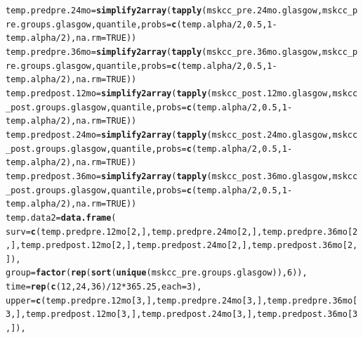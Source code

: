 \documentclass{article}\usepackage[]{graphicx}\usepackage[]{color}
\makeatletter
\newcommand{\hlnum}[1]{\textcolor[rgb]{0.686,0.059,0.569}{#1}}%
\newcommand{\hlopt}[1]{\textcolor[rgb]{0,0,0}{#1}}%
\newcommand{\hlstd}[1]{\textcolor[rgb]{0.345,0.345,0.345}{#1}}%
\newcommand{\hlkwb}[1]{\textcolor[rgb]{0.69,0.353,0.396}{#1}}%
\newcommand{\hlkwc}[1]{\textcolor[rgb]{0.333,0.667,0.333}{#1}}%
\newcommand{\hlkwd}[1]{\textcolor[rgb]{0.737,0.353,0.396}{\textbf{#1}}}%
\newenvironment{kframe}{%
 \def\at@end@of@kframe{}%
 \ifinner\ifhmode%
  \def\at@end@of@kframe{\end{minipage}}%
  \begin{minipage}{\columnwidth}%
 \fi\fi%
 \def\FrameCommand##1{\hskip\@totalleftmargin \hskip-\fboxsep
 \colorbox{shadecolor}{##1}\hskip-\fboxsep
     \hskip-\linewidth \hskip-\@totalleftmargin \hskip\columnwidth}%
 \MakeFramed {\advance\hsize-\width
   \@totalleftmargin\z@ \linewidth\hsize
   \@setminipage}}%
 {\par\unskip\endMakeFramed%
 \at@end@of@kframe}
\newenvironment{knitrout}{}{} %
\makeatother
\begin{document}
\begin{knitrout}
\begin{kframe}
\begin{alltt}
\hlstd{temp.predpre.24mo} \hlkwb{=} \hlkwd{simplify2array}\hlstd{(}\hlkwd{tapply}\hlstd{(mskcc_pre.24mo.glasgow, mskcc_pre.groups.glasgow, quantile,} \hlkwc{probs} \hlstd{=} \hlkwd{c}\hlstd{(temp.alpha}\hlopt{/}\hlnum{2}\hlstd{,} \hlnum{0.5}\hlstd{,} \hlnum{1}\hlopt{-}\hlstd{temp.alpha}\hlopt{/}\hlnum{2}\hlstd{),} \hlkwc{na.rm} \hlstd{=} \hlnum{TRUE}\hlstd{))}
\hlstd{temp.predpre.36mo} \hlkwb{=} \hlkwd{simplify2array}\hlstd{(}\hlkwd{tapply}\hlstd{(mskcc_pre.36mo.glasgow, mskcc_pre.groups.glasgow, quantile,} \hlkwc{probs} \hlstd{=} \hlkwd{c}\hlstd{(temp.alpha}\hlopt{/}\hlnum{2}\hlstd{,} \hlnum{0.5}\hlstd{,} \hlnum{1}\hlopt{-}\hlstd{temp.alpha}\hlopt{/}\hlnum{2}\hlstd{),} \hlkwc{na.rm} \hlstd{=} \hlnum{TRUE}\hlstd{))}
\hlstd{temp.predpost.12mo} \hlkwb{=} \hlkwd{simplify2array}\hlstd{(}\hlkwd{tapply}\hlstd{(mskcc_post.12mo.glasgow, mskcc_post.groups.glasgow, quantile,} \hlkwc{probs} \hlstd{=} \hlkwd{c}\hlstd{(temp.alpha}\hlopt{/}\hlnum{2}\hlstd{,} \hlnum{0.5}\hlstd{,} \hlnum{1}\hlopt{-}\hlstd{temp.alpha}\hlopt{/}\hlnum{2}\hlstd{),} \hlkwc{na.rm} \hlstd{=} \hlnum{TRUE}\hlstd{))}
\hlstd{temp.predpost.24mo} \hlkwb{=} \hlkwd{simplify2array}\hlstd{(}\hlkwd{tapply}\hlstd{(mskcc_post.24mo.glasgow, mskcc_post.groups.glasgow, quantile,} \hlkwc{probs} \hlstd{=} \hlkwd{c}\hlstd{(temp.alpha}\hlopt{/}\hlnum{2}\hlstd{,} \hlnum{0.5}\hlstd{,} \hlnum{1}\hlopt{-}\hlstd{temp.alpha}\hlopt{/}\hlnum{2}\hlstd{),} \hlkwc{na.rm} \hlstd{=} \hlnum{TRUE}\hlstd{))}
\hlstd{temp.predpost.36mo} \hlkwb{=} \hlkwd{simplify2array}\hlstd{(}\hlkwd{tapply}\hlstd{(mskcc_post.36mo.glasgow, mskcc_post.groups.glasgow, quantile,} \hlkwc{probs} \hlstd{=} \hlkwd{c}\hlstd{(temp.alpha}\hlopt{/}\hlnum{2}\hlstd{,} \hlnum{0.5}\hlstd{,} \hlnum{1}\hlopt{-}\hlstd{temp.alpha}\hlopt{/}\hlnum{2}\hlstd{),} \hlkwc{na.rm} \hlstd{=} \hlnum{TRUE}\hlstd{))}
\hlstd{temp.data2} \hlkwb{=} \hlkwd{data.frame}\hlstd{(}
        \hlkwc{surv} \hlstd{=} \hlkwd{c}\hlstd{(temp.predpre.12mo[}\hlnum{2}\hlstd{,], temp.predpre.24mo[}\hlnum{2}\hlstd{,], temp.predpre.36mo[}\hlnum{2}\hlstd{,], temp.predpost.12mo[}\hlnum{2}\hlstd{,], temp.predpost.24mo[}\hlnum{2}\hlstd{,], temp.predpost.36mo[}\hlnum{2}\hlstd{,]),}
        \hlkwc{group} \hlstd{=} \hlkwd{factor}\hlstd{(}\hlkwd{rep}\hlstd{(}\hlkwd{sort}\hlstd{(}\hlkwd{unique}\hlstd{(mskcc_pre.groups.glasgow)),} \hlnum{6}\hlstd{)),}
        \hlkwc{time} \hlstd{=} \hlkwd{rep}\hlstd{(}\hlkwd{c}\hlstd{(}\hlnum{12}\hlstd{,} \hlnum{24}\hlstd{,} \hlnum{36}\hlstd{)}\hlopt{/}\hlnum{12}\hlopt{*}\hlnum{365.25}\hlstd{,} \hlkwc{each} \hlstd{=} \hlnum{3}\hlstd{),}
        \hlkwc{upper} \hlstd{=} \hlkwd{c}\hlstd{(temp.predpre.12mo[}\hlnum{3}\hlstd{,], temp.predpre.24mo[}\hlnum{3}\hlstd{,], temp.predpre.36mo[}\hlnum{3}\hlstd{,], temp.predpost.12mo[}\hlnum{3}\hlstd{,], temp.predpost.24mo[}\hlnum{3}\hlstd{,], temp.predpost.36mo[}\hlnum{3}\hlstd{,]),}

\end{alltt}
\end{kframe}
\end{knitrout}
\end{document}
